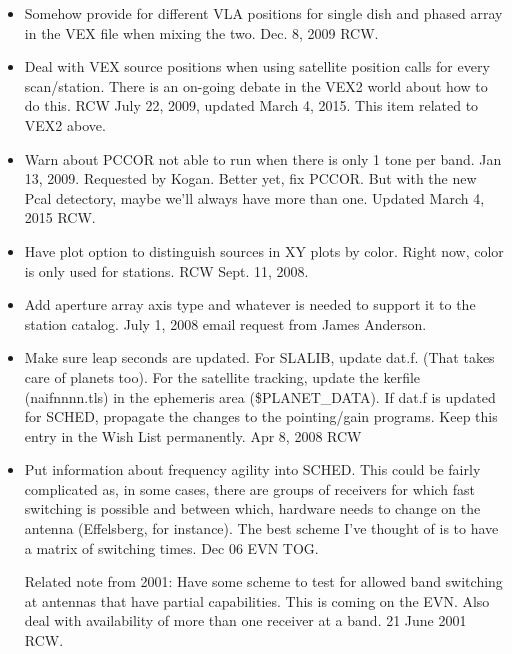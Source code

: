 \documentclass{report}
\begin{document}
\begin{itemize}
\item Somehow provide for different VLA positions for single dish
      and phased array in the VEX file when mixing the two.  Dec. 8,
      2009 RCW.

\item Deal with VEX source positions when using satellite position
      calls for every scan/station.  There is an on-going debate in the
      VEX2 world about how to do this.   RCW July 22, 2009, updated
      March 4, 2015.  This item related to VEX2 above.

\item Warn about PCCOR not able to run when there is only 1 tone per 
      band.  Jan 13, 2009.  Requested by Kogan.  Better yet, fix
      PCCOR.  But with the new Pcal detectory, maybe we'll always 
      have more than one.  Updated March 4, 2015  RCW.

\item Have plot option to distinguish sources in XY plots by color.
      Right now, color is only used for stations.  RCW  Sept. 11, 2008.

\item Add aperture array axis type and whatever is needed to support it
      to the station catalog.  July 1, 2008 email request from
      James Anderson.

\item Make sure leap seconds are updated.  For SLALIB, update dat.f.  
      (That takes care of planets too).  For the satellite tracking, 
      update the kerfile (naifnnnn.tls) in the ephemeris area 
      (\$PLANET\_DATA).  If dat.f is updated for SCHED, propagate the
      changes to the pointing/gain programs.  Keep this entry in the 
      Wish List permanently.  Apr 8, 2008 RCW

\item Put information about frequency agility into SCHED. This could
      be fairly complicated as, in some cases, there are groups of
      receivers for which fast switching is possible and between which,
      hardware needs to change on the antenna (Effelsberg, for instance).
      The best scheme I've thought of is to have a matrix of switching
      times.  Dec 06 EVN TOG.  

      Related note from 2001:  Have some scheme to test for allowed 
      band switching at antennas that have partial capabilities.  
      This is coming on the EVN. Also deal with availability of more 
      than one receiver at a band. 21 June 2001  RCW.


\end{itemize}
\end{document}
